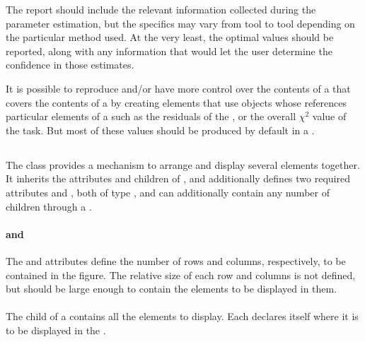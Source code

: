 \begin{blockChanged}

The report should include the relevant information collected during the parameter estimation, but the specifics may vary from tool to tool depending on the particular method used.  At the very least, the optimal \AdjustableParameter values should be reported, along with any information that would let the user determine the confidence in those estimates.

It is possible to reproduce and/or have more control over the contents of a \Report that covers the contents of a \ParameterEstimationTask by creating \DataGenerator elements that use \DependentVariable objects whose  references particular elements of a \ParameterEstimationTask such as the residuals of the \Objective, or the overall $\chi^2$ value of the task.  But most of these values should be produced by default in a \ParameterEstimationReport.


\subsection{}
\label{class:figure}
\label{class:listOfSubPlots}

The \Figure class provides a mechanism to arrange and display several \Plot elements together.  It inherits the attributes and children of \Output, and additionally defines two required attributes  and , both of type , and can additionally contain any number of \SubPlot children through a \ListOfSubPlots.


\paragraph*{ and }
The  and  attributes define the number of rows and columns, respectively, to be contained in the figure.  The relative size of each row and columns is not defined, but should be large enough to contain the \Plot elements to be displayed in them.

\paragraph*{}
The  child of a \Figure contains all the \Plot elements to display.  Each \SubPlot declares itself where it is to be displayed in the \Figure.



\end{blockChanged}
